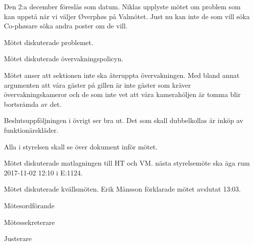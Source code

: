 \documentclass[10pt]{article}
\def\mo{Erik Månsson}
\def\ms{Johan Karlberg}
\def\ji{Niklas Gustafson}
\begin{document}
\begin{paragrafer}
Den 2:a december föreslås som datum.
Niklas upplyste mötet om problem som kan uppstå när vi väljer Øverphøs på Valmötet. Just nu kan inte de som vill söka Co-phøsare söka andra poster om de vill.

Mötet diskuterade problemet.

Mötet diskuterade övervakningspolicyn.

Mötet anser att sektionen inte ska återuppta övervakningen. Med bland annat argumenten att våra gäster på gillen är inte gäster som kräver övervakningskameror och de som inte vet att våra kamerahöljen är tomma blir bortsrämda av det.

Beslutsuppföljningen i övrigt ser bra ut. Det som skall dubbelkollas är inköp av funktionärskläder.

Alla i styrelsen skall se över dokument inför mötet.

Mötet diskuterade matlagningen till HT och VM.
{\Mba} nästa styrelsemöte ska äga rum 2017-11-02 12:10 i E:1124.

{\Ibfu}

Mötet diskuterade kvällsmöten.
{\mo} förklarade mötet avslutat 13:03.

\end{paragrafer}

\hidesignfoot
\begin{signatures}{3}
\signature{\mo}{Mötesordförande}
\signature{\ms}{Mötessekreterare}
\signature{\ji}{Justerare}
\end{signatures}
\end{document}
